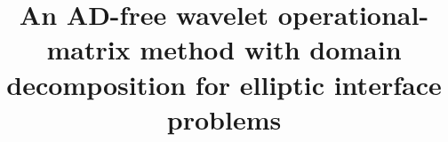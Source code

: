 \documentclass[preprint,12pt,authoryear]{elsarticle}
\begin{document}
\begin{frontmatter}



\title{An AD-free wavelet operational-matrix method with domain
decomposition for elliptic interface problems
} %


\author{} %


\begin{abstract}
\end{abstract}



\end{frontmatter}
\end{document}

